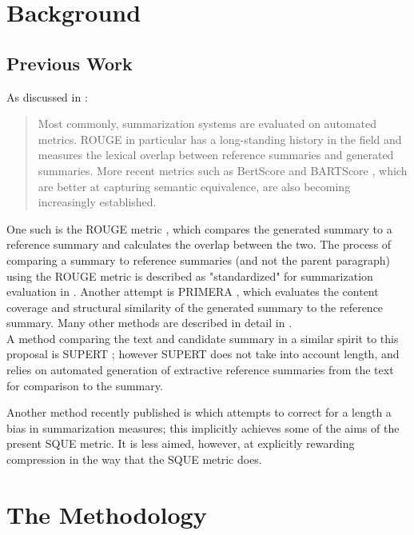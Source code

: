 \documentclass{article}
\begin{document}
\section{Background}

\subsection{Previous Work}
As discussed in \cite{retkowski2023current}:

\begin{quote}
Most commonly, summarization systems are evaluated on automated metrics. ROUGE \cite{lin_rouge_2004} in particular has a long-standing history in the field and measures the lexical overlap between reference summaries and generated summaries. More recent metrics such as BertScore \cite{zhang_bertscore_2019} and BARTScore \cite{yuan_bartscore_2021}, which are better at capturing semantic equivalence, are also becoming increasingly established. 
\end{quote}

One such is the ROUGE metric \citet{lin_rouge_2004}, which compares the generated summary to a reference summary and calculates the overlap between the two.
The process of comparing a summary to reference summaries (and not the parent paragraph) using the ROUGE metric is described as "standardized" for summarization evaluation in \cite{fabbri_summeval_2021}.
Another attempt is PRIMERA \citet{xiao_primera_2022}, which evaluates the content coverage and structural similarity of the generated summary to the reference summary.  
Many other methods are described in detail in \cite{fabbri_summeval_2021}.
\\
A method comparing the text and candidate summary in a similar spirit to this proposal is SUPERT \cite{supert}; however SUPERT does not take into account length, and relies on automated generation of extractive reference summaries from the text for comparison to the summary.

Another method recently published is \cite{guo-vosoughi-2023-length} which attempts to correct for a length a bias in summarization measures; this implicitly achieves some of the aims of the present SQUE metric.  It is less aimed, however, at explicitly rewarding compression in the way that the SQUE metric does.

\section{The Methodology}
\end{document}
